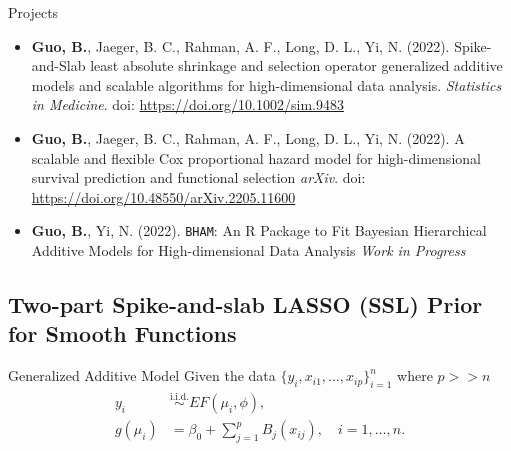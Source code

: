 \documentclass[
  ignorenonframetext,
  aspectratio=169]{beamer}
\begin{document}
\begin{frame}[fragile]{Projects}
\protect\hypertarget{projects}{}
\begin{itemize}
\item
  \textbf{Guo, B.}, Jaeger, B. C., Rahman, A. F., Long, D. L., Yi, N.
  (2022). Spike-and-Slab least absolute shrinkage and selection operator
  generalized additive models and scalable algorithms for
  high-dimensional data analysis. \emph{Statistics in Medicine}. doi:
  \url{https://doi.org/10.1002/sim.9483}
\item
  \textbf{Guo, B.}, Jaeger, B. C., Rahman, A. F., Long, D. L., Yi, N.
  (2022). A scalable and flexible Cox proportional hazard model for
  high-dimensional survival prediction and functional selection
  \emph{arXiv}. doi: \url{https://doi.org/10.48550/arXiv.2205.11600}
\item
  \textbf{Guo, B.}, Yi, N. (2022). \texttt{BHAM}: An R Package to Fit
  Bayesian Hierarchical Additive Models for High-dimensional Data
  Analysis \emph{Work in Progress}
\end{itemize}
\end{frame}

\hypertarget{two-part-spike-and-slab-lasso-ssl-prior-for-smooth-functions}{%
\subsection{Two-part Spike-and-slab LASSO (SSL) Prior for Smooth
Functions}\label{two-part-spike-and-slab-lasso-ssl-prior-for-smooth-functions}}

\begin{frame}{Generalized Additive Model}
\protect\hypertarget{generalized-additive-model}{}
Given the data \(\{y_i, x_{i1}, \dots ,x_{ip}\}_{i=1}^n\) where
\(p >> n\) \begin{align*}
y_i &\overset{\text{i.i.d.}}{\sim} EF(\mu_i, \phi),\\
g(\mu_i) &= \beta_0 + \sum\limits^p_{j=1}B_j(x_{ij}) , \quad i = 1, \dots, n.
\end{align*}
\end{frame}
\end{document}
